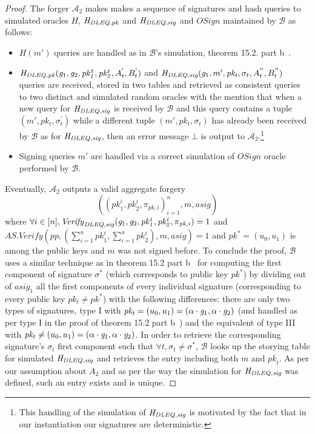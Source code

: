 \begin{proof}
\noindent The forger $\mathcal{A}_2$ makes makes a sequence of signatures and hash queries to simulated oracles $H$, $\mathit{H}_{\mathit{DLEQ}, \mathit{pk}}$ and $\mathit{H}_{\mathit{DLEQ}, \mathit{sig}}$ and 
$\mathit{OSign}$ maintained by $\mathcal{B}$ as follows: 
\begin{itemize}
\item $H(m')$ queries are handled as in $\mathcal{B}$'s simulation, theorem 15.2. part b~\cite{dabo_book}.   
\item $\mathit{H}_{\mathit{DLEQ}, \mathit{pk}}(\mathit{g}_{1}, \mathit{g}_{2}, \mathit{pk_1^{t}}, \mathit{pk_2^{t}}, A_t^{'}, B_t^{'})$ 
and $\mathit{H}_{\mathit{DLEQ}, \mathit{sig}}(\mathit{g}_{1}, m', \mathit{pk_{t}}, \sigma_{t}, A_t^{''}, B_t^{''})$ queries are received, stored in two tables and retrieved as 
consistent queries to two distinct and simulated random oracles with the mention that when a new query for $\mathit{H}_{\mathit{DLEQ}, \mathit{sig}}$ is received 
by $\mathcal{B}$ and this query contains a tuple $(m', \mathit{pk_{t}}, \sigma_{t}^{'})$ while a different tuple $(m', \mathit{pk_{t}}, \sigma_{t})$ 
has already been received by $\mathcal{B}$ as for $\mathit{H}_{\mathit{DLEQ}, \mathit{sig}}$, then an error message $\bot$ is output to 
$\mathcal{A}_2$.\footnote{This handling of the simulation of $\mathit{H}_{\mathit{DLEQ}, \mathit{sig}}$ is motivated by the fact that in our instantiation our signatures are deterministic.} 
\item Signing queries $m'$ are handled via a correct simulation of $\mathit{OSign}$ oracle performed by $\mathcal{B}$. 
\end{itemize}
\noindent Eventually, $\mathcal{A}_2$ outputs a valid aggregate forgery $$((\mathit{pk}_1^i, \mathit{pk}_2^i, \pi_{\mathit{pk}, i})_{i=1}^n, m, \mathit{asig})$$ where 
$\forall i \in[n], \mathit{Verify}_{\mathit{DLEQ}, \mathit{sig}}(\mathit{g}_{1}, \mathit{g}_{2}, \mathit{pk_1^i}, \mathit{pk_2^i}, \pi_{\mathit{pk}, i}) = 1$ and \\ 
$\mathit{AS.Verify}(\mathit{pp}, (\sum_{i=1}^n \mathit{pk}_1^i, \sum_{i=1}^n \mathit{pk}_2^i), m, \mathit{asig}) = 1$ and $\mathit{pk^*} = (u_0, u_1)$ 
is among the public keys and $m$ was not signed before. To conclude the proof, $\mathcal{B}$ uses a similar technique as in theorem 15.2 part b~\cite{dabo_book}  
for computing the first component of signature $\sigma^*$ (which corresponds to public key $\mathit{pk}^*$) by dividing out of $\mathit{asig_1}$ 
all the first components of every individual signature (corresponding to every public key $\mathit{pk_t} \neq \mathit{pk^*}$) 
with the following differences: there are only two types of signatures, type I with 
$\mathit{pk_t} = (u_0, u_1) = (\alpha \cdot \mathit{g}_{1}, \alpha \cdot \mathit{g}_{2})$ (and handled as per type I in the proof of theorem 15.2 part b~\cite{dabo_book}) 
and the equivalent of type III with $\mathit{pk_t} \neq (u_0, u_1) = (\alpha \cdot \mathit{g}_{1}, \alpha \cdot \mathit{g}_{2})$. In order to retrieve the corresponding signature's 
$\sigma_t$ first component such that $\forall t, \sigma_t \neq \sigma^*$, $\mathcal{B}$ looks up the storying table for simulated $\mathit{H}_{\mathit{DLEQ}, \mathit{sig}}$ 
and retrieves the entry including both $m$ and $\mathit{pk}_t$. As per our assumption about $\mathit{A}_2$ and as per the way the simulation for 
$\mathit{H}_{\mathit{DLEQ}, \mathit{sig}}$ was defined, such an entry exists and is unique. 
\end{proof}